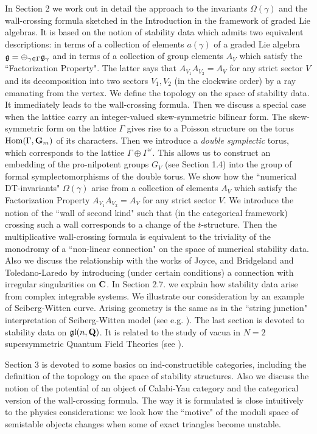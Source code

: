 \documentclass[12pt]{article}
\begin{document}
In Section 2 we work out in  detail the approach to the invariants $\Omega(\gamma)$ and the wall-crossing formula sketched in the Introduction in the framework of graded Lie algebras.
It is based on the notion of stability data which admits two equivalent descriptions: in terms of a collection of elements $a(\gamma)$ of a graded Lie algebra ${\mathfrak g}=\oplus_{\gamma\in \Gamma}{\mathfrak g}_{\gamma}$ and in terms of a collection of group
elements $A_V$ which satisfy
the ``Factorization Property". The latter says  that $A_{V_1}A_{V_2}=A_{V}$ for any strict sector $V$ and its decomposition into two sectors $V_1,V_2$ (in the clockwise order) by a ray emanating from the vertex.
We define the topology on the space of stability data. It immediately leads to the wall-crossing
formula. Then we discuss a special case when the lattice  carry an integer-valued skew-symmetric bilinear form.
The skew-symmetric form on the lattice $\Gamma$ gives rise
to a Poisson structure on the torus $\operatorname{Hom}(\Gamma,{\bf G}_m)$ of its characters.
Then we introduce a {\it double symplectic} torus, which corresponds to  the lattice $\Gamma\oplus \Gamma^{\vee}$.
This allows us to construct  an embedding of the pro-nilpotent groups $G_V$ (see Section 1.4) into the group of
formal symplectomorphisms
of the double torus. We show how the ``numerical DT-invariants" $\Omega(\gamma)$ arise from a collection of elements $A_V$ which satisfy
the Factorization Property $A_{V_1}A_{V_2}=A_{V}$ for any strict sector $V$. We introduce the notion of the ``wall of second kind" such that
(in the categorical framework) crossing such a wall corresponds to a change of the $t$-structure.
Then the multiplicative wall-crossing formula is equivalent to the triviality of the monodromy of a ``non-linear connection" on the space of numerical stability data. Also we discuss the relationship with the works of Joyce, and Bridgeland and Toledano-Laredo by introducing (under certain conditions) a  connection with irregular singularities on ${\bf C}$. In Section 2.7. we explain how 
stability data arise from complex
integrable systems. We illustrate our consideration by an example
of Seiberg-Witten curve. Arising geometry is the same as in the
``string junction" interpretation of Seiberg-Witten model (see e.g.
\cite{MikNekSet}).
The last section is devoted to stability data on $\mathfrak{gl}(n,{\bf Q})$. It is related to the study of vacua in $N=2$ supersymmetric Quantum Field Theories (see \cite{CeVa}).

Section 3 is devoted to some basics on  ind-constructible categories, including
the definition of the topology on the space of stability structures. Also we discuss the notion of the potential of an object of Calabi-Yau category and the categorical version of the wall-crossing formula.
The way it is formulated is close intuitively to the physics considerations: we look how the ``motive" of the moduli space of semistable objects changes when some of exact triangles become unstable.
\end{document}
